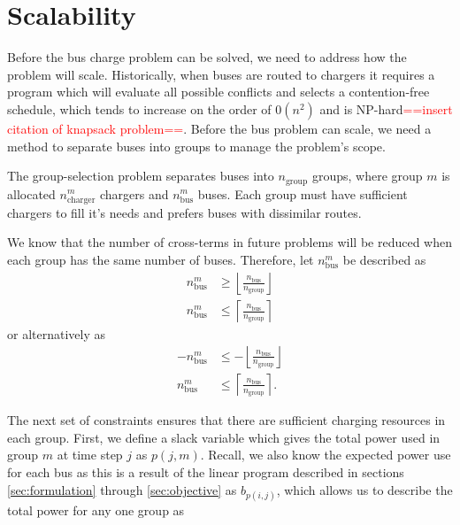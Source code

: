 \section{Scalability}
Before the bus charge problem can be solved, we need to address how the problem will scale. Historically, when buses are routed to chargers it requires a program which will evaluate all possible conflicts and selects a contention-free schedule, which tends to increase on the order of $0(n^2)$ and is NP-hard\textcolor{red}{==insert citation of knapsack problem==}. Before the bus problem can scale, we need a method to separate buses into groups to manage the problem's scope.
\par The group-selection problem separates buses into $n_{\text{group}}$ groups, where group $m$ is allocated $n^m_{\text{charger}}$ chargers and $n^m_{\text{bus}}$ buses. Each group must have sufficient chargers to fill it's needs and prefers buses with dissimilar routes. 
\par We know that the number of cross-terms in future problems will be reduced when each group has the same number of buses. Therefore, let $n^m_{\text{bus}}$ be described as
\begin{equation*}\begin{aligned}
	n^m_{\text{bus}} &\ge \left \lfloor \frac{n_{\text{bus}}}{n_{\text{group}}} \right \rfloor \\
	n^m_{\text{bus}} &\le \left \lceil \frac{n_{\text{bus}}}{n_{\text{group}}} \right \rceil
\end{aligned}\end{equation*}
or alternatively as 
\begin{equation}\begin{aligned}
	-n^m_{\text{bus}} &\le -\left \lfloor \frac{n_{\text{bus}}}{n_{\text{group}}} \right \rfloor \\
	n^m_{\text{bus}} &\le \left \lceil \frac{n_{\text{bus}}}{n_{\text{group}}} \right \rceil.
\end{aligned}\end{equation}
\par The next set of constraints ensures that there are sufficient charging resources in each group.  First, we define a slack variable which gives the total power used in group $m$ at time step $j$ as $p(j,m)$. Recall, we also know the expected power use for each bus as this is a result of the linear program described in sections \ref{sec:formulation} through \ref{sec:objective} as $b_{p(i,j)}$, which allows us to describe the total power for any one group as
